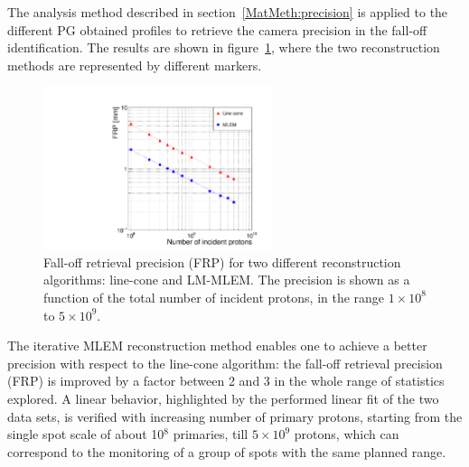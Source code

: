 The analysis method described in section~\ref{MatMeth:precision} is applied to the different PG obtained profiles to retrieve the camera precision in the fall-off identification. The results are shown in figure~\ref{fig:precision}, where the two reconstruction methods are represented by different markers.

\begin{figure}	
\centering
\includegraphics[width=0.6\textwidth]{./Figure/new/precisionVSprimaries.pdf}
\caption{Fall-off retrieval precision (FRP) for two different reconstruction algorithms: line-cone and LM-MLEM. The precision is shown as a function of the total number of incident protons, in the range $1\times10^{8}$ to $5\times10^{9}$.}	
\label{fig:precision}
\end{figure}

The iterative MLEM reconstruction method enables one to achieve a better precision with respect to the line-cone algorithm: the fall-off retrieval precision (FRP) is improved by a factor between 2 and 3 in the whole range of statistics explored. A linear behavior, highlighted by the performed linear fit of the two data sets, is verified with increasing number of primary protons, starting from the single spot scale of about 10$^8$ primaries, till $5\times10^9$ protons, which can correspond to the monitoring of a group of spots with the same planned range. 

\newpage